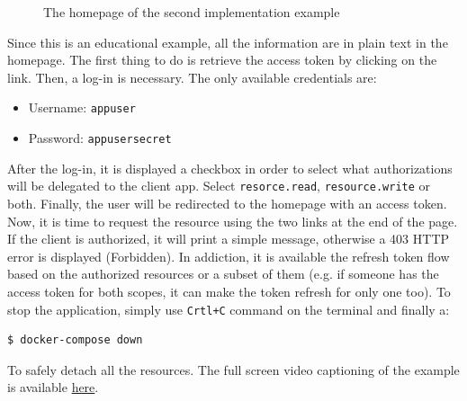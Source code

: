 \begin{figure}[h!]
    \centering
    \caption{The homepage of the second implementation example}
    \label{fig:home2}
\end{figure}

\noindent Since this is an educational example, all the information are in plain text in the homepage. The first thing to do is retrieve the access token by clicking on the link. Then, a log-in is necessary. The only available credentials are:

\begin{itemize}
    \item Username: \texttt{appuser}
    \item Password: \texttt{appusersecret}
\end{itemize}


\noindent After the log-in, it is displayed a checkbox in order to select what authorizations will be delegated to the client app. Select \texttt{resorce.read}, \texttt{resource.write} or both. 
Finally, the user will be redirected to the homepage with an access token. Now, it is time to request the resource using the two links at the end of the page. If the client is authorized, it will print a simple message, otherwise a 403 HTTP error is displayed (Forbidden). In addiction, it is available the refresh token flow based on the authorized resources or a subset of them (e.g. if someone has the access token for both scopes, it can make the token refresh for only one too). To stop the application, simply use \texttt{Crtl+C} command on the terminal and finally a:
\begin{lstlisting}[language=bash]
  $ docker-compose down
\end{lstlisting}



\noindent To safely detach all the resources.
The full screen video captioning of the example is available \href{https://github.com/nopesir/oauth-hw-security-custom/releases/download/v0.1-alpha/hw-security-custom-screen.mp4}{here}. 
